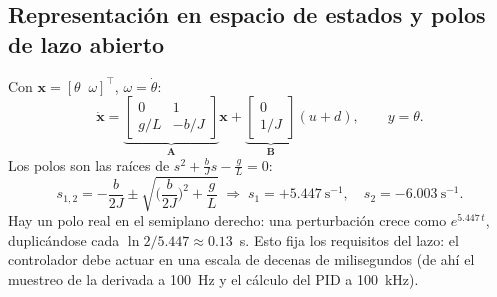 \documentclass[11pt,a4paper]{article}
\begin{document}
\subsection{Representaci\'on en espacio de estados y polos de lazo abierto}
Con $\bm x=[\theta\;\;\omega]^\top$, $\omega=\dot\theta$:
\begin{equation}
\dot{\bm x}=\underbrace{\begin{bmatrix}0&1\\ g/L & -b/J\end{bmatrix}}_{\bm A}\bm x+
\underbrace{\begin{bmatrix}0\\ 1/J\end{bmatrix}}_{\bm B}(u+d),\qquad y=\theta .
\end{equation}
Los polos son las ra\'ices de $s^2+\tfrac{b}{J}s-\tfrac{g}{L}=0$:
\begin{equation}
s_{1,2}=-\frac{b}{2J}\pm\sqrt{\Big(\frac{b}{2J}\Big)^2+\frac{g}{L}}
\;\Rightarrow\; s_1=+5.447\ \mathrm{s^{-1}},\quad s_2=-6.003\ \mathrm{s^{-1}} .
\end{equation}
Hay un polo real en el semiplano derecho: una perturbaci\'on crece como $e^{5.447\,t}$,
duplic\'andose cada $\ln 2/5.447\approx 0.13$~s. Esto fija los requisitos del lazo: el
controlador debe actuar en una escala de decenas de milisegundos (de ah\'i el muestreo
de la derivada a 100~Hz y el c\'alculo del PID a 100~kHz).
\end{document}
